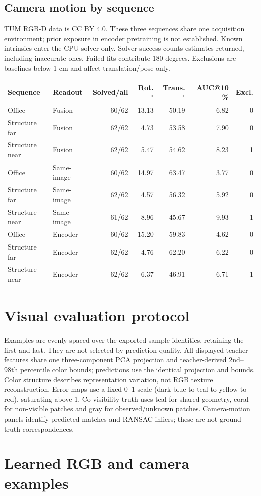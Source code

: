 \documentclass[10pt]{article}
\begin{document}
\subsection{Camera motion by sequence}
TUM RGB-D data \cite{tum} is CC BY 4.0. These three sequences share one acquisition environment; prior exposure in encoder pretraining is not established. Known intrinsics enter the CPU solver only. Solver success counts estimates returned, including inaccurate ones. Failed fits contribute 180 degrees. Exclusions are baselines below 1 cm and affect translation/pose only.
\begin{center}\small\begin{tabular}{llrrrrr}\toprule Sequence & Readout & Solved/all & Rot. $^\circ$ & Trans. $^\circ$ & AUC@10 \% & Excl. \\ \midrule
Office & Fusion & 60/62 & 13.13 & 50.19 & 6.82 & 0 \\
Structure far & Fusion & 62/62 & 4.73 & 53.58 & 7.90 & 0 \\
Structure near & Fusion & 62/62 & 5.47 & 54.62 & 8.23 & 1 \\
Office & Same-image & 60/62 & 14.97 & 63.47 & 3.77 & 0 \\
Structure far & Same-image & 62/62 & 4.57 & 56.32 & 5.92 & 0 \\
Structure near & Same-image & 61/62 & 8.96 & 45.67 & 9.93 & 1 \\
Office & Encoder & 60/62 & 15.20 & 59.83 & 4.62 & 0 \\
Structure far & Encoder & 62/62 & 4.76 & 62.20 & 6.22 & 0 \\
Structure near & Encoder & 62/62 & 6.37 & 46.91 & 6.71 & 1 \\
\bottomrule\end{tabular}\end{center}
\section{Visual evaluation protocol}
Examples are evenly spaced over the exported sample identities, retaining the first and last. They are not selected by prediction quality. All displayed teacher features share one three-component PCA projection and teacher-derived 2nd--98th percentile color bounds; predictions use the identical projection and bounds. Color structure describes representation variation, not RGB texture reconstruction. Error maps use a fixed 0--1 scale (dark blue to teal to yellow to red), saturating above 1. Co-visibility truth uses teal for shared geometry, coral for non-visible patches and gray for observed/unknown patches. Camera-motion panels identify predicted matches and RANSAC inliers; these are not ground-truth correspondences.
\clearpage\section*{Learned RGB and camera examples}
\end{document}
